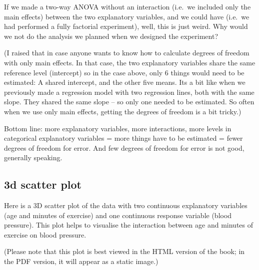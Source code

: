 \documentclass[
  letterpaper,
  8pt,
  a4paper]{book}
\begin{document}
If we made a two-way ANOVA without an interaction (i.e.~we included only
the main effects) between the two explanatory variables, and we could
have (i.e.~we had performed a fully factorial experiment), well, this is
just weird. Why would we not do the analysis we planned when we designed
the experiment?

(I raised that in case anyone wants to know how to calculate degrees of
freedom with only main effects. In that case, the two explanatory
variables share the same reference level (intercept) so in the case
above, only 6 things would need to be estimated: A shared intercept, and
the other five means. Its a bit like when we previously made a
regression model with two regression lines, both with the same slope.
They shared the same slope -- so only one needed to be estimated. So
often when we use only main effects, getting the degrees of freedom is a
bit tricky.)

Bottom line: more explanatory variables, more interactions, more levels
in categorical explanatory variables = more things have to be estimated
= fewer degrees of freedom for error. And few degrees of freedom for
error is not good, generally speaking.

\subsection*{3d scatter plot}\label{d-scatter-plot}

Here is a 3D scatter plot of the data with two continuous explanatory
variables (age and minutes of exercise) and one continuous response
variable (blood pressure). This plot helps to visualise the interaction
between age and minutes of exercise on blood pressure.

(Please note that this plot is best viewed in the HTML version of the
book; in the PDF version, it will appear as a static image.)
\end{document}
